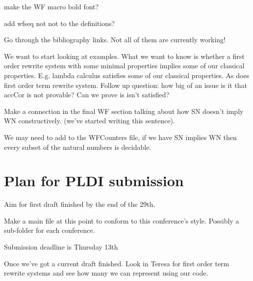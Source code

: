 \documentclass{article}
\newcommand{\cmark}{\ding{51}}%
\newcommand{\done}{\rlap{$\square$}{\raisebox{2pt}{\large\hspace{1pt}\cmark}}%
\hspace{-2.5pt}}
\begin{document}
\begin{todolist}
\item [\done] make the WF macro bold font?
\item add wfseq not not to the definitions?
\item [\done] Go through the bibliography links. Not all of them are currently working!
\item We want to start looking at examples. What we want to know is whether a first order rewrite system with some minimal properties implies some of our classical properties. E.g. lambda calculus satisfies some of our classical properties. As does first order term rewrite system. Follow up question: how big of an issue is it that accCor is not provable? Can we prove is isn't satisfied? 
\item [\done] Make a connection in the final WF section talking about how SN doesn't imply WN constructively. (we've started writing this sentence). 
\item We may need to add to the WFCounters file, if we have SN implies WN then every subset of the natural numbers is decidable.  
\end{todolist}


\section*{Plan for PLDI submission}
\begin{todolist}
  \item Aim for first draft finished by the end of the 29th.
  \item Make a main file at this point to conform to this conference's style. Possibly a sub-folder for each conference.
  \item Submission deadline is Thursday 13th 
  \item Once we've got a current draft finished. Look in Teresa for first order term rewrite systems and see how many we can represent using our code.
\end{todolist}
\end{document}
